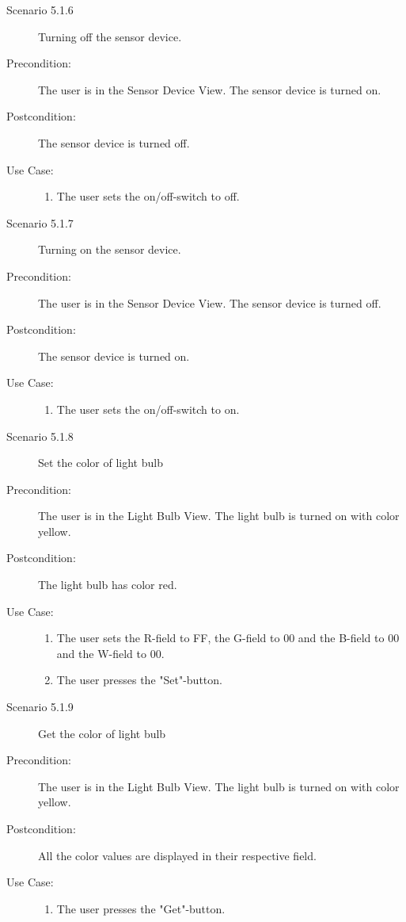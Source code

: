 \documentclass[a4paper]{article}
\begin{document}
\begin{description}
\item[]

\item[Scenario 5.1.6] Turning off the sensor device.
\item[Precondition:] The user is in the Sensor Device View. The sensor device is turned on.
\item[Postcondition:] The sensor device is turned off.
\item[Use Case:]\mbox{}
\begin{enumerate}
\item  The user sets the on/off-switch to off.
\end{enumerate}

\item[]

\item[Scenario 5.1.7] Turning on the sensor device.
\item[Precondition:] The user is in the Sensor Device View. The sensor device is turned off.
\item[Postcondition:] The sensor device is turned on.
\item[Use Case:]\mbox{}
\begin{enumerate}
\item  The user sets the on/off-switch to on.
\end{enumerate}

\item[]

\item[Scenario 5.1.8] Set the color of light bulb
\item[Precondition:] The user is in the Light Bulb View. The light bulb is turned on with color yellow.
\item[Postcondition:] The light bulb has color red.
\item[Use Case:]\mbox{}
\begin{enumerate}
\item  \label{4} The user sets the R-field to FF, the G-field to 00 and the B-field to 00 and the W-field to 00.
\item The user presses the "Set"-button.

\end{enumerate}

\item[]

\item[Scenario 5.1.9] Get the color of light bulb
\item[Precondition:] The user is in the Light Bulb View. The light bulb is turned on with color yellow.
\item[Postcondition:] All the color values are displayed in their respective field.
\item[Use Case:]\mbox{}
\begin{enumerate}
\item  \label{4} The user presses the "Get"-button.
\end{enumerate}


\end{description}
\end{document}
